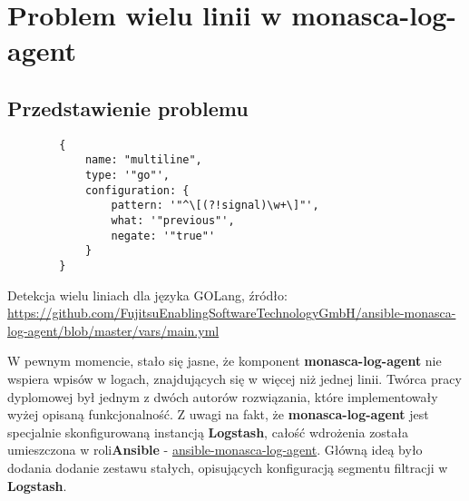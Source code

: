 \section{Problem wielu linii w monasca-log-agent}
\label{chapter:application_own:own_work:monasca_log_agent}

    \subsection{Przedstawienie problemu}
    \begin{listing}[h]
        \begin{verbatim}
        {
            name: "multiline",
            type: '"go"',
            configuration: {
                pattern: '"^\[(?!signal)\w+\]"',
                what: '"previous"',
                negate: '"true"'
            }
        }
        \end{verbatim}
        \caption[Detekcja wielu liniach dla języka GOLang]{
            Detekcja wielu liniach dla języka GOLang, źródło: \url{https://github.com/FujitsuEnablingSoftwareTechnologyGmbH/ansible-monasca-log-agent/blob/master/vars/main.yml}}
        \label{chapter:application_own:own_work:monasca_log_agent:filter_example}
    \end{listing}
    
    W pewnym momencie, stało się jasne, że komponent \textbf{monasca-log-agent} nie wspiera wpisów w logach, znajdujących się 
    w więcej niż jednej linii. Twórca pracy dyplomowej był jednym z dwóch autorów rozwiązania, które implementowały wyżej 
    opisaną funkcjonalność. Z uwagi na fakt, że \textbf{monasca-log-agent} jest specjalnie skonfigurowaną instancją 
    \textbf{Logstash}, całość wdrożenia została umieszczona w roli\textbf{Ansible} - 
    \href{https://github.com/FujitsuEnablingSoftwareTechnologyGmbH/ansible-monasca-log-agent}{ansible-monasca-log-agent}.
    Główną ideą było dodania dodanie zestawu stałych, opisujących konfiguracją segmentu filtracji w \textbf{Logstash}.

